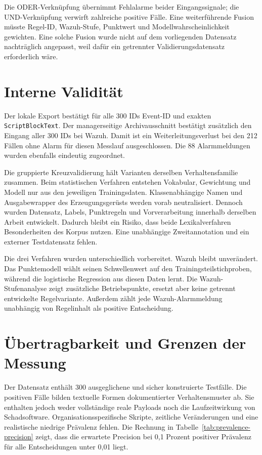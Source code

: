 \documentclass[12pt,a4paper,oneside,parskip=half]{scrreprt}
\begin{document}
Die ODER-Verknüpfung übernimmt Fehlalarme beider Eingangssignale; die UND-Verknüpfung verwirft zahlreiche positive Fälle. Eine weiterführende Fusion müsste Regel-ID, Wazuh-Stufe, Punktwert und Modellwahrscheinlichkeit gewichten. Eine solche Fusion wurde nicht auf dem vorliegenden Datensatz nachträglich angepasst, weil dafür ein getrennter Validierungsdatensatz erforderlich wäre.
\section{Interne Validität}
\label{sec:internal-validity}
Der lokale Export bestätigt für alle 300 IDs Event-ID und exakten \texttt{ScriptBlockText}. Der managerseitige Archivausschnitt bestätigt zusätzlich den Eingang aller 300 IDs bei Wazuh. Damit ist ein Weiterleitungsverlust bei den 212 Fällen ohne Alarm für diesen Messlauf ausgeschlossen. Die 88 Alarmmeldungen wurden ebenfalls eindeutig zugeordnet.

Die gruppierte Kreuzvalidierung hält Varianten derselben Verhaltensfamilie zusammen. Beim statistischen Verfahren entstehen Vokabular, Gewichtung und Modell nur aus den jeweiligen Trainingsdaten. Klassenabhängige Namen und Ausgabewrapper des Erzeugungsgerüsts werden vorab neutralisiert. Dennoch wurden Datensatz, Labels, Punktregeln und Vorverarbeitung innerhalb derselben Arbeit entwickelt. Dadurch bleibt ein Risiko, dass beide Lexikalverfahren Besonderheiten des Korpus nutzen. Eine unabhängige Zweitannotation und ein externer Testdatensatz fehlen.

Die drei Verfahren wurden unterschiedlich vorbereitet. Wazuh bleibt unverändert. Das Punktemodell wählt seinen Schwellenwert auf den Trainingsteilstichproben, während die logistische Regression aus diesen Daten lernt. Die Wazuh-Stufenanalyse zeigt zusätzliche Betriebspunkte, ersetzt aber keine getrennt entwickelte Regelvariante. Außerdem zählt jede Wazuh-Alarmmeldung unabhängig von Regelinhalt als positive Entscheidung.

\section{Übertragbarkeit und Grenzen der Messung}
Der Datensatz enthält 300 ausgeglichene und sicher konstruierte Testfälle. Die positiven Fälle bilden textuelle Formen dokumentierter Verhaltensmuster ab. Sie enthalten jedoch weder vollständige reale Payloads noch die Laufzeitwirkung von Schadsoftware. Organisationsspezifische Skripte, zeitliche Veränderungen und eine realistische niedrige Prävalenz fehlen. Die Rechnung in Tabelle~\ref{tab:prevalence-precision} zeigt, dass die erwartete Precision bei 0{,}1 Prozent positiver Prävalenz für alle Entscheidungen unter 0{,}01 liegt.
\end{document}
